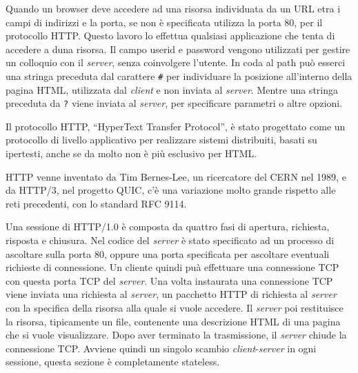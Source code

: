 \documentclass{article}
\numberwithin{equation}{subsection}
\begin{document}

Quando un browser deve accedere ad una risorsa individuata da un URL etra i campi di indirizzi e la porta, se non è specificata utilizza la porta 80, per il protocollo 
\textcolor{NavyBlue}{HTTP}. Questo lavoro lo effettua qualsiasi applicazione che tenta di accedere a duna risorsa. 
Il campo userid e password vengono utilizzati per gestire un colloquio con il \textit{server}, senza coinvolgere l'utente. In coda al path può esserci una stringa preceduta dal 
carattere \verb|#| per individuare la posizione all'interno della pagina \textcolor{Peach}{HTML}, utilizzata dal \textit{client} e non inviata al \textit{server}. 
Mentre una stringa preceduta da \verb|?| viene inviata al \textit{server}, per specificare parametri o altre opzioni. 

Il protocollo \textcolor{NavyBlue}{HTTP}, ``HyperText Transfer Protocol'', è stato progettato come un protocollo di livello applicativo per realizzare sistemi distribuiti, basati su 
ipertesti, anche se da molto non è più esclusivo per \textcolor{Peach}{HTML}. 


\textcolor{NavyBlue}{HTTP} venne inventato da Tim Bernes-Lee, un ricercatore del CERN nel 1989, e da \textcolor{NavyBlue}{HTTP}/3, nel progetto QUIC, c'è una variazione molto grande rispetto alle reti 
precedenti, con lo standard RFC 9114. 


Una sessione di \textcolor{NavyBlue}{HTTP}/1.0 è composta da quattro fasi di apertura, richiesta, risposta e chiusura. Nel codice del \textit{server} è stato specificato ad un processo di ascoltare 
sulla porta 80, oppure una porta specificata per ascoltare eventuali richieste di connessione. Un cliente quindi puà effettuare una connessione \textcolor{Bittersweet}{TCP} con questa 
porta \textcolor{Bittersweet}{TCP} del \textit{server}. Una volta instaurata una connessione \textcolor{Bittersweet}{TCP} viene inviata una richiesta al \textit{server}, un pacchetto \textcolor{NavyBlue}{HTTP} di richiesta al \textit{server} con la specifica della 
risorsa alla quale si vuole accedere. Il \textit{server} poi restituisce la risorsa, tipicamente un file, contenente una descrizione \textcolor{Peach}{HTML} di una pagina che si vuole visualizzare. 
Dopo aver terminato la trasmissione, il \textit{server} chiude la connessione \textcolor{Bittersweet}{TCP}. 
Avviene quindi un singolo scambio \textit{client}-\textit{server} in ogni sessione, questa sezione è completamente stateless. 
\end{document}
